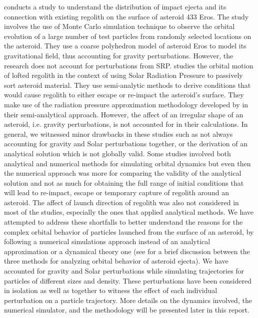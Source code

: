 \FloatBarrier

\cite{korycansky2004_impactEjecta} conducts a study to understand the distribution of impact ejecta and its connection with existing regolith on the surface of asteroid 433 Eros. The study involves the use of Monte Carlo simulation technique to observe the orbital evolution of a large number of test particles from randomly selected locations on the asteroid. They use a coarse polyhedron model of asteroid Eros to model its gravitational field, thus accounting for gravity perturbations. However, the research does not account for perturbations from \gls{SRP}. \cite{yarnoz2014passive} studies the orbital motion of lofted regolith in the context of using Solar Radiation Pressure to passively sort asteroid material. They use semi-analytic methods to derive conditions that would cause regolith to either escape or re-impact the asteroid’s surface. They make use of the radiation pressure approximation methodology developed by \cite{richter1995stability} in their semi-analytical approach. However, the affect of an irregular shape of an asteroid, i.e. gravity perturbations, is not accounted for in their calculations.
%
\newline\newline
%
In general, we witnessed minor drawbacks in these studies such as not always accounting for gravity and Solar perturbations together, or the derivation of an analytical solution which is not globally valid. Some studies involved both analytical and numerical methods for simulating orbital dynamics but even then the numerical approach was more for comparing the validity of the analytical solution and not as much for obtaining the full range of initial conditions that will lead to re-impact, escape or temporary capture of regolith around an asteroid. The affect of launch direction of regolith was also not considered in most of the studies, especially the ones that applied analytical methods. We have attempted to address these shortfalls to better understand the reasons for the complex orbital behavior of particles launched from the surface of an asteroid, by following a numerical simulations approach instead of an analytical approximation or a dynamical theory one (see \cite{scheeres2002fate} for a brief discussion between the three methods for analyzing orbital behavior of asteroid ejecta). We have accounted for gravity and Solar perturbations while simulating trajectories for particles of different sizes and density. These perturbations have been considered in isolation as well as together to witness the effect of each individual perturbation on a particle trajectory. More details on the dynamics involved, the numerical simulator, and the methodology will be presented later in this report.

